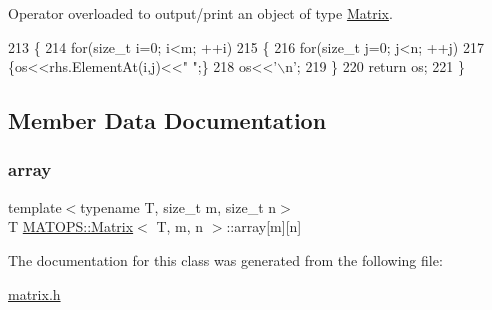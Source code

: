 Operator overloaded to output/print an object of type \hyperlink{classMATOPS_1_1Matrix}{Matrix}. 


\begin{DoxyCode}
213                         \{
214                                 \textcolor{keywordflow}{for}(\textcolor{keywordtype}{size\_t} i=0; i<m; ++i)
215                                         \{
216                                                 \textcolor{keywordflow}{for}(\textcolor{keywordtype}{size\_t} j=0; j<n; ++j)
217                                                         \{os<<rhs.ElementAt(i,j)<<\textcolor{stringliteral}{" "};\}
218                                                 os<<\textcolor{charliteral}{'\(\backslash\)n'};
219                                         \}
220                                 \textcolor{keywordflow}{return} os;
221                         \}
\end{DoxyCode}


\subsection{Member Data Documentation}
\mbox{\label{classMATOPS_1_1Matrix_af2a995c9d251f109d54040e2732a93f0}} 
\subsubsection{\texorpdfstring{array}{array}}
{\footnotesize\ttfamily template$<$typename T, size\+\_\+t m, size\+\_\+t n$>$ \\
T \hyperlink{classMATOPS_1_1Matrix}{M\+A\+T\+O\+P\+S\+::\+Matrix}$<$ T, m, n $>$\+::array\mbox{[}m\mbox{]}\mbox{[}n\mbox{]}\hspace{0.3cm}{\ttfamily [private]}}



The documentation for this class was generated from the following file\+:\begin{DoxyCompactItemize}
\item 
\hyperlink{matrix_8h}{matrix.\+h}\end{DoxyCompactItemize}

